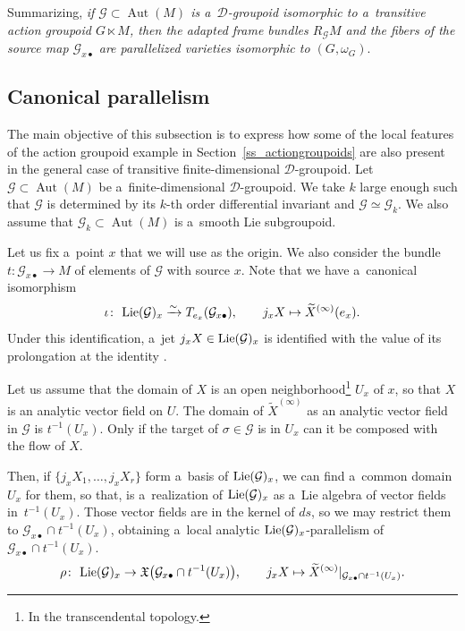 \documentclass[10pt,a4paper]{amsart}
\numberwithin{equation}{section}
\theoremstyle{definition}
\begin{document}
Summarizing, \emph{if $\mathcal G\subset \operatorname{Aut}(M)$ is a~$\mathcal D$-groupoid isomorphic to a~transitive action groupoid $G\ltimes M$, then the adapted frame bundles $R_\mathcal GM$ and the fibers of the source map $\mathcal G_{x\bullet}$ are parallelized varieties isomorphic to $(G,\omega_G)$}.

\subsection{Canonical parallelism}

The main objective of this subsection is to express how some of the local features of the action groupoid example in Section~\ref{ss_actiongroupoids} are also present in the general case of transitive finite-dimensional $\mathcal D$-groupoid. Let $\mathcal G\subset\operatorname{Aut}(M)$ be a~finite-dimensional $\mathcal D$-groupoid. We take $k$ large enough such that $\mathcal G$ is determined by its $k$-th order differential invariant and $\mathcal G \simeq \mathcal G_k$. We also assume that $\mathcal G_k\subset\operatorname{Aut}(M)$ is a~smooth Lie subgroupoid.

Let us fix a~point $x$ that we will use as the origin. We also consider the bundle $t\colon \mathcal G_{x\bullet}\to M$ of elements of $\mathcal G$ with source $x$. Note that we have a~canonical isomorphism
\[\iota\colon\ {\rm Lie}(\mathcal G)_x \xrightarrow{\sim} T_{e_x}(\mathcal G_{x\bullet}), \qquad j_xX\mapsto \widetilde{X}^{(\infty)}(e_x).\]
Under this identification, a~jet $j_xX\in {\rm Lie}(\mathcal G)_x$ is identified with the value of its prolongation at the identity .

Let us assume that the domain of $X$ is an open neighborhood\footnote{In the transcendental topology.} $U_x$ of $x$, so that $X$ is an analytic vector field on $U$. The domain of $\widetilde{X}^{(\infty)}$ as an analytic vector field in $\mathcal G$ is $t^{-1}(U_x)$. Only if the target of $\sigma\in\mathcal G$ is in $U_x$ can it be composed with the flow of $X$.

Then, if $\{j_xX_1,\dots,j_xX_r\}$ form a~basis of ${\rm Lie}(\mathcal G)_x$, we can find a~common domain $U_x$ for them, so that,  is a~realization of ${\rm Lie}(\mathcal G)_x$ as a~Lie algebra of vector fields in~$t^{-1}(U_x)$. Those vector fields are in the kernel of $ds$, so we may restrict them to $\mathcal G_{x \bullet} \cap t^{-1}(U_x)$, obtaining a~local analytic ${\rm Lie}(\mathcal G)_x$-parallelism of $\mathcal G_{x\bullet} \cap t^{-1}(U_x)$.
\[\rho \colon\ {\rm Lie}(\mathcal G)_x \to \mathfrak X\bigl(\mathcal G_{x\bullet} \cap t^{-1}(U_x)\bigr),
 \qquad j_xX \mapsto \widetilde X^{(\infty)}\vert_{\mathcal G_{x\bullet} \cap t^{-1}(U_x)}.\]
\end{document}
